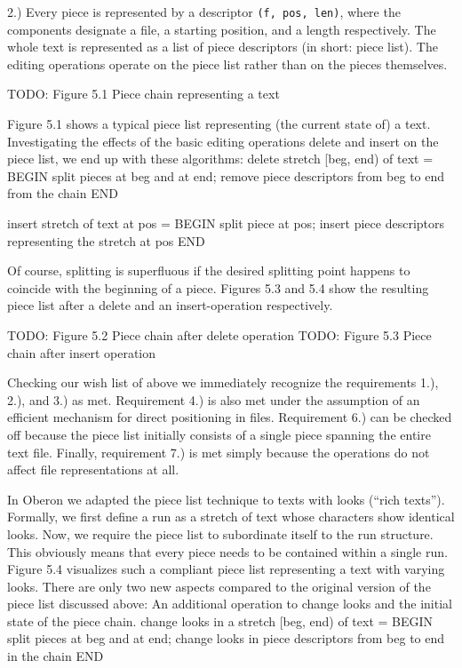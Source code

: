 2.) Every piece is represented by a descriptor {\tt (f, pos, len)\/}, where
the components designate a file, a starting position, and a length
respectively. The whole text is represented as a list of piece
descriptors (in short: piece list). The editing operations operate on
the piece list rather than on the pieces themselves.

TODO: Figure 5.1 Piece chain representing a text

Figure 5.1 shows a typical piece list representing (the current state
of) a text. Investigating the effects of the basic editing operations
delete and insert on the piece list, we end up with these algorithms:
\begintt
delete stretch [beg, end) of text = BEGIN
  split pieces at beg and at end;
  remove piece descriptors from beg to end from the chain
END
  
insert stretch of text at pos = BEGIN
  split piece at pos;
  insert piece descriptors representing the stretch at pos
END
\endtt

\noindent Of course, splitting is superfluous if the desired splitting point
happens to coincide with the beginning of a piece. Figures 5.3 and 5.4
show the resulting piece list after a delete and an insert-operation
respectively.

TODO: Figure 5.2 Piece chain after delete operation
TODO: Figure 5.3 Piece chain after insert operation

Checking our wish list of above we immediately recognize the
requirements 1.), 2.), and 3.) as met. Requirement 4.) is also met
under the assumption of an efficient mechanism for direct positioning
in files. Requirement 6.) can be checked off because the piece list
initially consists of a single piece spanning the entire text
file. Finally, requirement 7.) is met simply because the operations do
not affect file representations at all.

In Oberon we adapted the piece list technique to texts with looks
(``rich texts''). Formally, we first define a run as a stretch of text
whose characters show identical looks. Now, we require the piece list
to subordinate itself to the run structure. This obviously means that
every piece needs to be contained within a single run. Figure 5.4
visualizes such a compliant piece list representing a text with
varying looks. There are only two new aspects compared to the original
version of the piece list discussed above: An additional operation to
change looks and the initial state of the piece chain.
\begintt
change looks in a stretch [beg, end) of text = BEGIN
  split pieces at beg and at end;
  change looks in piece descriptors from beg to end in the chain
END
\endtt

